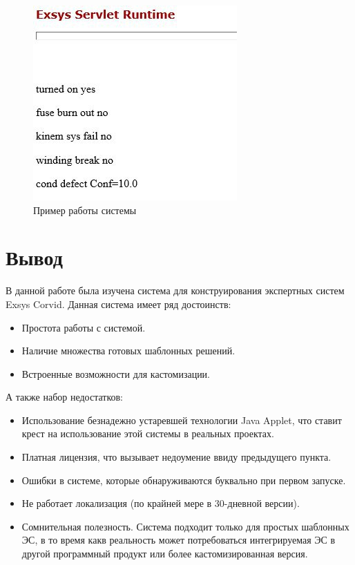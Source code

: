 \documentclass[14pt,a4paper,report]{report}
\begin{document}
\begin{figure}[h!]
	\centering
	\includegraphics[scale = 0.7]{images/7_1.jpg}
	\caption{Пример работы системы}
\end{figure}




\section{Вывод}

В данной работе была изучена система для конструирования экспертных систем Exsys Corvid. Данная система имеет ряд достоинств:

\begin{itemize}
	\item Простота работы с системой.
	\item Наличие множества готовых шаблонных решений.
	\item Встроенные возможности для кастомизации.
\end{itemize}

А также набор недостатков:

\begin{itemize}
	\item Использование безнадежно устаревшей технологии Java Applet, что ставит крест на использование этой системы в реальных проектах.
	\item Платная лицензия, что вызывает недоумение ввиду предыдущего пункта.
	\item Ошибки в системе, которые обнаруживаются буквально при первом запуске.
	\item Не работает локализация (по крайней мере в 30-дневной версии).
	\item Сомнительная полезность. Система подходит только для простых шаблонных ЭС, в то время какв реальность может потребоваться интегрируемая ЭС в другой программный продукт или более кастомизированная версия.
\end{itemize}
\end{document}
